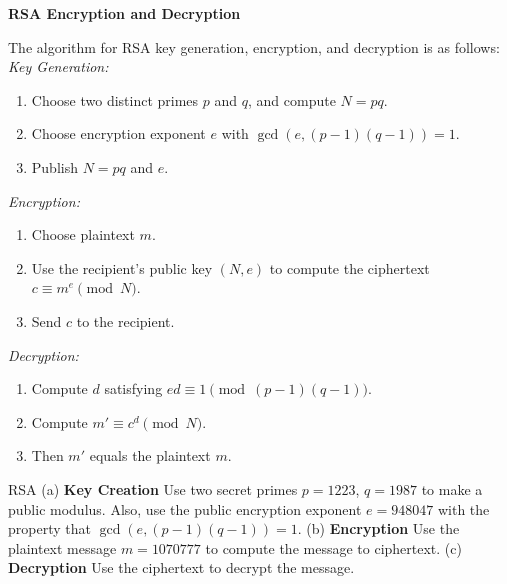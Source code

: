 \begin{center}
    \textbf{RSA Encryption and Decryption}
\end{center}

The algorithm for RSA key generation, encryption, and decryption is as follows: \\

\textit{Key Generation:}
\begin{enumerate}
    \item Choose two distinct primes \(p\) and \(q\), and compute \(N = pq\).
    \item Choose encryption exponent \(e\) with \(\gcd(e,(p-1)(q-1)) = 1\). 
    \item Publish \(N = pq\) and \(e\).
\end{enumerate}

\textit{Encryption:}
\begin{enumerate}
    \item Choose plaintext \(m\). 
    \item Use the recipient's public key \((N,e)\) to compute the ciphertext \(c \equiv m^e \pmod{N}\).
    \item Send \(c\) to the recipient.
\end{enumerate}

\textit{Decryption:}
\begin{enumerate}
    \item Compute \(d\) satisfying \(ed \equiv 1 \pmod{(p-1)(q-1)}\).
    \item Compute \(m' \equiv c^d \pmod{N}\).
    \item Then \(m'\) equals the plaintext \(m\).
\end{enumerate}

\begin{example}
    {RSA} (a) \textbf{Key Creation} Use two secret primes \(p = 1223\), \(q = 1987\) to make a public modulus. Also, use the public encryption exponent \(e = 948047\) with the property that \(\gcd(e,(p - 1)(q - 1)) = 1\). (b) \textbf{Encryption} Use the plaintext message \(m = 1070777\) to compute the message to ciphertext. (c) \textbf{Decryption} Use the ciphertext to decrypt the message.
\end{example}

